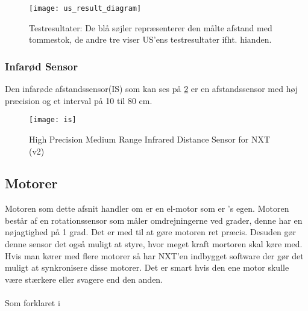 \begin{figure}[h]
\centering
\texttt{[image: us\_result\_diagram]}
\caption{Testresultater: De blå søjler repræsenterer den målte afstand med tommestok, de andre tre viser US'ens testresultater ifht. hianden.}
\label{sensor:ultrasonic_resultat_diagram}
\end{figure}


\subsubsection{Infarød Sensor}
Den infarøde afstandssensor(IS) som kan ses på \ref{sensor:infraroed_sensor} er en afstandssensor med høj præcision og et interval på 10 til 80 cm.

\begin{figure}[h]
\centering
\texttt{[image: is]} 	
\caption{High Precision Medium Range Infrared Distance Sensor for NXT (v2)}
\label{sensor:infraroed_sensor}
\end{figure}

\subsection{Motorer}
Motoren som dette afsnit handler om er en el-motor som er \lego's egen.
Motoren består af en rotationssensor som måler omdrejningerne ved grader, denne har en nøjagtighed på 1 grad. Det er med til at gøre motoren ret præcis. 
Desuden gør denne sensor det også muligt at styre, hvor meget kraft mortoren skal køre med.
Hvis man kører med flere motorer så har NXT'en indbygget software der gør det muligt at synkronisere disse motorer.
Det er smart hvis den ene motor skulle være stærkere eller svagere end den anden.
\\\\
Som forklaret i \label{mindsqualls}